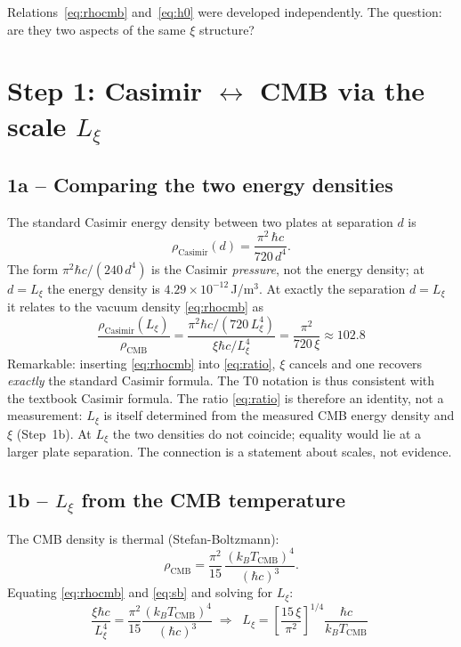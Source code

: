 \noindent Relations~\eqref{eq:rhocmb} and~\eqref{eq:h0} were developed
independently. The question: are they two aspects of the same $\xi$ structure?

\section{Step 1: Casimir $\leftrightarrow$ CMB via the scale $L_\xi$}

\subsection*{1a -- Comparing the two energy densities}

The standard Casimir energy density between two plates at separation $d$ is
\begin{equation}
  \rho_\text{Casimir}(d) = \frac{\pi^2\,\hbar c}{720\,d^4}.
  \label{eq:rhocas}
\end{equation}
The form $\pi^2\hbar c/(240\,d^4)$ is the Casimir \emph{pressure}, not the
energy density; at $d = L_\xi$ the energy density is
$4.29\times10^{-12}$\,J/m$^3$.
At exactly the separation $d=L_\xi$ it relates to the vacuum density
\eqref{eq:rhocmb} as
\begin{equation}
  \boxed{\;\frac{\rho_\text{Casimir}(L_\xi)}{\rho_\text{CMB}}
  = \frac{\pi^2\hbar c/(720\,L_\xi^4)}{\xi\hbar c/L_\xi^4}
  = \frac{\pi^2}{720\,\xi}\approx 102.8\;}
  \label{eq:ratio}
\end{equation}
Remarkable: inserting \eqref{eq:rhocmb} into \eqref{eq:ratio}, $\xi$ cancels and
one recovers \emph{exactly} the standard Casimir formula. The T0 notation is
thus consistent with the textbook Casimir formula. The ratio
\eqref{eq:ratio} is therefore an identity, not a measurement: $L_\xi$ is itself
determined from the measured CMB energy density and $\xi$ (Step~1b). At $L_\xi$
the two densities do not coincide; equality would lie at a larger plate
separation. The connection is a statement about scales, not evidence.

\subsection*{1b -- $L_\xi$ from the CMB temperature}

The CMB density is thermal (Stefan-Boltzmann):
\begin{equation}
  \rho_\text{CMB} = \frac{\pi^2}{15}\,\frac{(k_B T_\text{CMB})^4}{(\hbar c)^3}.
  \label{eq:sb}
\end{equation}
Equating \eqref{eq:rhocmb} and \eqref{eq:sb} and solving for $L_\xi$:
\begin{equation}
  \frac{\xi\hbar c}{L_\xi^4} = \frac{\pi^2}{15}\frac{(k_BT_\text{CMB})^4}{(\hbar c)^3}
  \;\Longrightarrow\;
  \boxed{\;L_\xi = \left[\frac{15\,\xi}{\pi^2}\right]^{1/4}\frac{\hbar c}{k_B T_\text{CMB}}\;}
  \label{eq:Lxi}
\end{equation}

